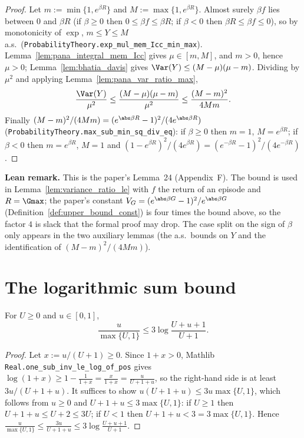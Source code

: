 \begin{proof}
\leanok
Let $m := \min\{1, e^{\beta R}\}$ and $M := \max\{1, e^{\beta R}\}$.
Almost surely $\beta f$ lies between $0$ and $\beta R$ (if $\beta \ge 0$ then
$0 \le \beta f \le \beta R$; if $\beta < 0$ then $\beta R \le \beta f \le 0$), so by
monotonicity of $\exp$, $m \le Y \le M$ a.s.\ (\texttt{ProbabilityTheory.exp\_mul\_mem\_Icc\_min\_max}).
Lemma~\ref{lem:pana_integral_mem_Icc} gives
$\mu \in [m, M]$, and $m > 0$, hence $\mu > 0$; Lemma~\ref{lem:bhatia_davis} gives
$\Var(Y) \le (M - \mu)(\mu - m)$.
Dividing by $\mu^2$ and applying Lemma~\ref{lem:pana_var_ratio_max},
\[
  \frac{\Var(Y)}{\mu^2} \le \frac{(M - \mu)(\mu - m)}{\mu^2} \le \frac{(M - m)^2}{4Mm} .
\]
Finally $(M - m)^2/(4Mm) = (e^{\abs\beta R} - 1)^2/(4e^{\abs\beta R})$
(\texttt{ProbabilityTheory.max\_sub\_min\_sq\_div\_eq}): if $\beta \ge 0$ then $m = 1$,
$M = e^{\beta R}$; if $\beta < 0$ then $m = e^{\beta R}$, $M = 1$ and
$(1 - e^{\beta R})^2/(4e^{\beta R}) = (e^{-\beta R} - 1)^2/(4e^{-\beta R})$.
\end{proof}

\textbf{Lean remark.} This is the paper's Lemma~24 (Appendix~F). The bound is used in
Lemma~\ref{lem:variance_ratio_le} with $f$ the return of an episode and $R = \Gmax$; the
paper's constant $V_G = (e^{\abs\beta G} - 1)^2/e^{\abs\beta G}$ (Definition~\ref{def:upper_bound_const})
is four times the bound above, so the factor $4$ is slack that the formal proof may drop.
The case split on the sign of $\beta$ only appears in the two auxiliary lemmas (the a.s.\ bounds
on $Y$ and the identification of $(M - m)^2/(4Mm)$).

\section{The logarithmic sum bound}
\label{sec:pre_analysis_log_sum}

\begin{lemma}\label{lem:pana_log_sum_step}
\leanok
For $U \ge 0$ and $u \in [0, 1]$,
\[
  \frac{u}{\max\{U, 1\}} \le 3\log\frac{U + u + 1}{U + 1} .
\]
\end{lemma}

\begin{proof}
\leanok
Let $x := u/(U + 1) \ge 0$. Since $1 + x > 0$, Mathlib \texttt{Real.one\_sub\_inv\_le\_log\_of\_pos}
gives $\log(1 + x) \ge 1 - \frac{1}{1 + x} = \frac{x}{1 + x} = \frac{u}{U + 1 + u}$, so the
right-hand side is at least $3u/(U + 1 + u)$. It
suffices to show $u(U + 1 + u) \le 3u\max\{U, 1\}$, which follows from $u \ge 0$ and
$U + 1 + u \le 3\max\{U, 1\}$: if $U \ge 1$ then
$U + 1 + u \le U + 2 \le 3U$; if $U < 1$ then $U + 1 + u < 3 = 3\max\{U, 1\}$. Hence
$\frac{u}{\max\{U,1\}} \le \frac{3u}{U + 1 + u} \le 3\log\frac{U + u + 1}{U + 1}$.
\end{proof}


